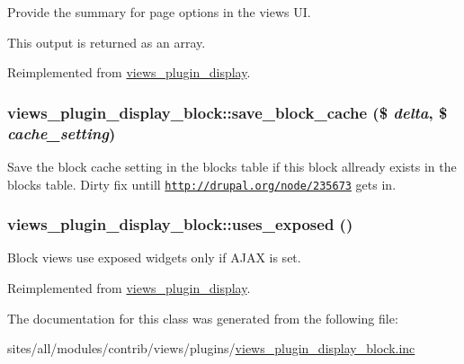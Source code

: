 Provide the summary for page options in the views UI.

This output is returned as an array. 

Reimplemented from \hyperlink{classviews__plugin__display_7a2f2aeedfc14816815e3ce65a61aedf}{views\_\-plugin\_\-display}.\hypertarget{classviews__plugin__display__block_58ba8f810894ad2e7c43c49552005ceb}{
\subsubsection[{save\_\-block\_\-cache}]{\setlength{\rightskip}{0pt plus 5cm}views\_\-plugin\_\-display\_\-block::save\_\-block\_\-cache (\$ {\em delta}, \/  \$ {\em cache\_\-setting})}}
\label{classviews__plugin__display__block_58ba8f810894ad2e7c43c49552005ceb}


Save the block cache setting in the blocks table if this block allready exists in the blocks table. Dirty fix untill \href{http://drupal.org/node/235673}{\tt http://drupal.org/node/235673} gets in. \hypertarget{classviews__plugin__display__block_b0995994a4c7436de2790c7ad8d7ea74}{
\subsubsection[{uses\_\-exposed}]{\setlength{\rightskip}{0pt plus 5cm}views\_\-plugin\_\-display\_\-block::uses\_\-exposed ()}}
\label{classviews__plugin__display__block_b0995994a4c7436de2790c7ad8d7ea74}


Block views use exposed widgets only if AJAX is set. 

Reimplemented from \hyperlink{classviews__plugin__display_5bfcb22187618f52bea9ea626aff18a4}{views\_\-plugin\_\-display}.

The documentation for this class was generated from the following file:\begin{CompactItemize}
\item 
sites/all/modules/contrib/views/plugins/\hyperlink{views__plugin__display__block_8inc}{views\_\-plugin\_\-display\_\-block.inc}\end{CompactItemize}
